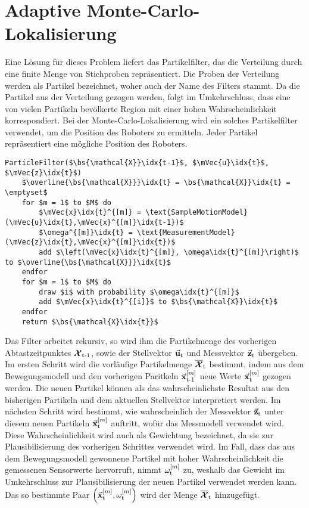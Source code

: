 \newpage
\section{Adaptive Monte-Carlo-Lokalisierung}
Eine Lösung für dieses Problem liefert das Partikelfilter, das die Verteilung durch eine
finite Menge von Stichproben repräsentiert. Die Proben der Verteilung werden als Partikel
bezeichnet, woher auch der Name des Filters stammt. Da die Partikel aus der Verteilung
gezogen werden, folgt im Umkehrschluss, dass eine von vielen Partikeln bevölkerte Region
mit einer hohen Wahrscheinlichkeit korrespondiert. Bei der Monte-Carlo-Lokalisierung wird ein solches Partikelfilter verwendet, um die Position des Roboters zu ermitteln. Jeder Partikel repräsentiert eine mögliche Position des Roboters.

\begin{lstlisting}[mathescape=true, caption={Monte-Carlo-Lokalisierung}, captionpos=bot]
ParticleFilter($\bs{\mathcal{X}}\idx{t-1}$, $\mVec{u}\idx{t}$, $\mVec{z}\idx{t}$)
	$\overline{\bs{\mathcal{X}}}\idx{t} = \bs{\mathcal{X}}\idx{t} = \emptyset$
	for $m = 1$ to $M$ do
		$\mVec{x}\idx{t}^{[m]} = \text{SampleMotionModel}(\mVec{u}\idx{t},\mVec{x}^{[m]}\idx{t-1})$
		$\omega^{[m]}\idx{t} = \text{MeasurementModel}(\mVec{z}\idx{t},\mVec{x}^{[m]}\idx{t})$
		add $\left(\mVec{x}\idx{t}^{[m]}, \omega\idx{t}^{[m]}\right)$ to $\overline{\bs{\mathcal{X}}}\idx{t}$
	endfor
	for $m = 1$ to $M$ do
		draw $i$ with probability $\omega\idx{t}^{[m]}$
		add $\mVec{x}\idx{t}^{[i]}$ to $\bs{\mathcal{X}}\idx{t}$
	endfor
	return $\bs{\mathcal{X}\idx{t}}$
\end{lstlisting}
Das Filter arbeitet rekursiv, so wird ihm die Partikelmenge des vorherigen Abtastzeitpunktes $\boldsymbol{\mathcal{X}}_{\text{t-1}}$, sowie der Stellvektor $\vec{\mathbf{u}}_{\text{t}}$ und Messvektor $\vec{\mathbf{z}}_{\text{t}}$ übergeben. Im ersten Schritt wird die vorläufige Partikelmenge $\overline{\boldsymbol{\mathcal{X}}}_{\text{t}}$ bestimmt, indem aus dem Bewegungsmodell und den vorherigen Paritkeln $\vec{\mathbf{x}}_{\text{t-1}}^{[m]}$ neue Werte $\vec{\mathbf{x}}_{\text{t}}^{[m]}$ gezogen werden. Die neuen Partikel können als das wahrscheinlichste Resultat aus den bisherigen Partikeln und dem aktuellen Stellvektor interpretiert werden. Im nächsten Schritt wird bestimmt, wie wahrscheinlich der Messvektor $\vec{\mathbf{z}}_{\text{t}}$ unter diesem neuen Partikeln $\vec{\mathbf{x}}_{\text{t}}^{[m]}$ auftritt, wofür das Messmodell verwendet wird. Diese Wahrscheinlichkeit wird auch als Gewichtung bezeichnet, da sie zur Plausibilisierung des vorherigen Schrittes verwendet wird. Im Fall, dass das aus dem Bewegungsmodell gewonnene Partikel mit hoher Wahrscheinlichkeit die gemessenen Sensorwerte hervorruft, nimmt $\omega^{[m]}_{\text{t}}$ zu, weshalb das Gewicht im Umkehrschluss zur Plausibilisierung der neuen Partikel verwendet werden kann. Das so bestimmte Paar $\left(\vec{\mathbf{x}}_{\text{t}}^{[m]}, \omega_{\text{t}}^{[m]}\right)$ wird der Menge $\overline{\boldsymbol{\mathcal{X}}}_{\text{t}}$ hinzugefügt.
